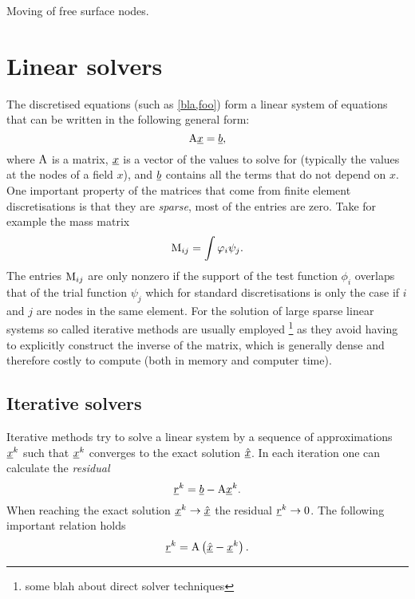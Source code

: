 Moving of free surface nodes.

\section{Linear solvers} \label{ND_Linear_solvers}
The discretised equations (such as \eqref{bla,foo}) form 
a linear system of equations that can be written 
in the following general form:
\begin{equation*}
  \mathrm{A}\underline{x}=\underline{b},
\end{equation*}
where $\mathrm{A}$ is a matrix, $\underline{x}$ is a vector of the values 
to solve for (typically the values at the nodes of a field $x$), 
and $\underline{b}$ contains all the terms that do not depend on 
$x$. One important property of the matrices that come from 
finite element discretisations is that they are \emph{sparse}, 
\ie most of the entries are zero. Take for example the mass matrix
\begin{equation*}
  \mathrm{M}_{ij}=\int \varphi_i \psi_j.
\end{equation*}
The entries $\mathrm{M}_{ij}$ are only nonzero if the support of the 
test function $\phi_i$ overlaps that of the trial function 
$\psi_j$ which for standard \PN discretisations is only the case if
$i$ and $j$ are nodes in the same element. For the solution of large
sparse linear systems so called iterative methods are usually employed
\footnote{some blah about direct solver techniques} as they 
avoid having to explicitly construct the inverse of the matrix, 
which is generally dense and therefore costly to compute 
(both in memory and computer time).

\subsection{Iterative solvers}
Iterative methods try to solve a linear system by a sequence 
of approximations $\underline{x}^k$ such that $\underline{x}^k$ converges to
the exact solution $\underline{\hat x}$. In each iteration one can 
calculate the \emph{residual}
\begin{equation*}
  \underline{r}^k = \underline{b} - \mathrm{A}\underline{x}^k.
\end{equation*}
When reaching the exact solution $\underline{x}^k\to\underline{\hat x}$ the 
residual $\underline{r}^k\to 0$. The following important relation holds
\begin{equation}\label{eq:residual_error}
  \underline{r}^k = \mathrm{A}\left( \underline{\hat x} - \underline{x}^k \right).
\end{equation}

